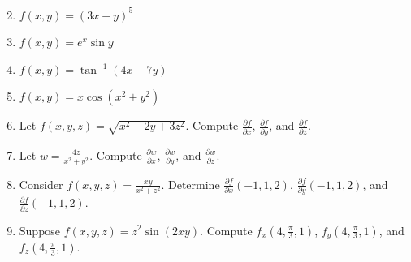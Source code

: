 \documentclass[12pt]{article}
\newif\ifans
\begin{document}

\begin{enumerate}
\setcounter{enumi}{1}

\item $f(x,y)=(3x-y)^5$

\ifans{\fbox{$f_x(x,y)=15(3x-y)^4$; $f_y(x,y)=-5(3x-y)^4$}} \fi

\item $f(x,y)=e^x\sin{y}$

\ifans{\fbox{$f_x(x,y)=e^x\sin{y}$; $f_y(x,y)=e^x\cos{y}$}} \fi

\item $f(x,y)=\tan^{-1}{(4x-7y)}$

\ifans{\fbox{$f_x(x,y)=\frac{4}{1+(4x-7y)^2}$; $f_y(x,y)=-\frac{7}{1+(4x-7y)^2}$}} \fi

\item $f(x,y)=x\cos{(x^2+y^2)}$

\ifans{\fbox{$f_x(x,y)=\cos{(x^2+y^2)}-2x^2\sin{(x^2+y^2)}$; $f_y(x,y)=-2xy\sin{(x^2+y^2)}$}} \fi

\item Let $f(x,y,z)=\sqrt{x^2-2y+3z^2}$.  Compute $\frac{\partial f}{\partial x}$,  $\frac{\partial f}{\partial y}$, and $\frac{\partial f}{\partial z}$.

\ifans{\fbox{$\frac{\partial f}{\partial x}=\frac{x}{\sqrt{x^2-2y+3z^2}}$; $\frac{\partial f}{\partial y}=\frac{-1}{\sqrt{x^2-2y+3z^2}}$; $\frac{\partial f}{\partial z}=\frac{3z}{\sqrt{x^2-2y+3z^2}}$}} \fi

\item Let $w=\frac{4z}{x^2+y^2}$.  Compute $\frac{\partial w}{\partial x}$, $\frac{\partial w}{\partial y}$, and $\frac{\partial w}{\partial z}$.

\ifans{\fbox{$\frac{\partial w}{\partial x}=-\frac{8xz}{(x^2+y^2)^2}$; $\frac{\partial w}{\partial y}=-\frac{8yz}{(x^2+y^2)^2}$; $\frac{\partial w}{\partial z}=\frac{4}{x^2+y^2}$}} \fi

\item Consider $f(x,y,z)=\frac{xy}{x^2+z^2}$.  Determine $\frac{\partial f}{\partial x}(-1, 1, 2)$, $\frac{\partial f}{\partial y}(-1, 1, 2)$, and $\frac{\partial f}{\partial z}(-1, 1, 2)$.

\ifans{\fbox{$\left.\frac{\partial f}{\partial x}\right|_{(x,y,z)=(-1,1,2)}=\frac{3}{25}$; $\left.\frac{\partial f}{\partial y}\right|_{(x,y,z)=(-1,1,2)}=-\frac{1}{5}$; $\left.\frac{\partial f}{\partial z}\right|_{(x,y,z)=(-1,1,2)}=\frac{4}{25}$}} \fi

\item Suppose $f(x,y,z)=z^2\sin{(2xy)}$.  Compute $f_x\left(4, \frac{\pi}{3}, 1\right)$, $f_y\left(4, \frac{\pi}{3}, 1\right)$, and $f_z\left(4, \frac{\pi}{3}, 1\right)$.

\ifans{\fbox{$f_x\left(4,\frac{\pi}{3},1\right)=-\frac{\pi}{3}$, $f_y\left(4,\frac{\pi}{3},2\right)=-4$, $f_z\left(4,\frac{\pi}{3},2\right)=\sqrt{3}$} } \fi

\end{enumerate}
\end{document}

